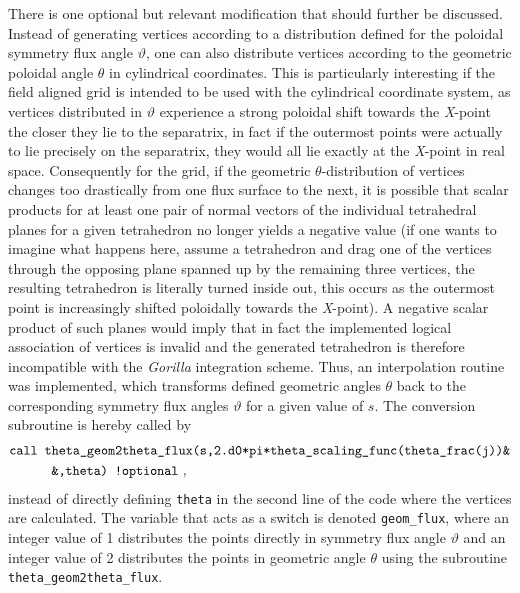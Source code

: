 \documentclass[./main.tex]{subfiles}
\begin{document}
There is one optional but relevant modification that should further be discussed. Instead of generating vertices according to a distribution defined for the poloidal symmetry flux angle $\vartheta$, one can also distribute vertices according to the geometric poloidal angle $\theta$ in cylindrical coordinates. This is particularly interesting if the field aligned grid is intended to be used with the cylindrical coordinate system, as vertices distributed in $\vartheta$ experience a strong poloidal shift towards the \textit{X}-point the closer they lie to the separatrix, in fact if the outermost points were actually to lie precisely on the separatrix, they would all lie exactly at the \textit{X}-point in real space. Consequently for the grid, if the geometric $\theta$-distribution of vertices changes too drastically from one flux surface to the next, it is possible that scalar products for at least one pair of normal vectors of the individual tetrahedral planes for a given tetrahedron no longer yields a negative value (if one wants to imagine what happens here, assume a tetrahedron and drag one of the vertices through the opposing plane spanned up by the remaining three vertices, the resulting tetrahedron is literally turned inside out, this occurs as the outermost point is increasingly shifted poloidally towards the \textit{X}-point). A negative scalar product of such planes would imply that in fact the implemented logical association of vertices is invalid and the generated tetrahedron is therefore incompatible with the \textit{Gorilla} integration scheme. Thus, an interpolation routine was implemented, which transforms defined geometric angles $\theta$ back to the corresponding symmetry flux angles $\vartheta$ for a given value of $s$. The conversion subroutine is hereby called by
\begin{align*}
&\texttt{call theta\_geom2theta\_flux(s,2.d0*pi*theta\_scaling\_func(theta\_frac(j))\&}\\
&\hspace{1.1cm}\texttt{\&,theta) !optional}~,
\end{align*}
instead of directly defining \texttt{theta} in the second line of the code where the vertices are calculated. The variable that acts as a switch is denoted \texttt{geom\_flux}, where an integer value of 1 distributes the points directly in symmetry flux angle $\vartheta$ and an integer value of 2 distributes the points in geometric angle $\theta$ using the subroutine \texttt{theta\_geom2theta\_flux}.
\end{document}
